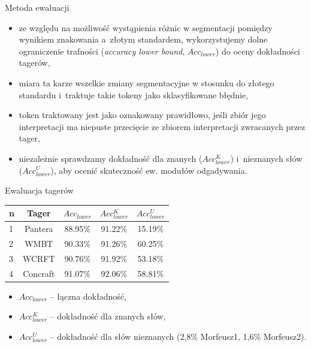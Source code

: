 \documentclass[xcolor=dvipsnames,polish]{beamer}
\begin{document}
\begin{frame}{Metoda ewaluacji}
\begin{itemize}
\item ze względu na możliwość wystąpienia różnic w segmentacji pomiędzy wynikiem znakowania a~złotym standardem, wykorzystujemy dolne ograniczenie trafności (\emph{accuracy lower bound}, $Acc_{lower}$) do oceny dokładności tagerów,
\item miara ta karze wszelkie zmiany segmentacyjne w stosunku do złotego standardu i~traktuje takie tokeny jako sklasyfikowane błędnie,
\item token traktowany jest jako oznakowany prawidłowo, jeśli zbiór jego interpretacji ma niepuste przecięcie ze zbiorem interpretacji zwracanych przez tager,
\item niezależnie sprawdzamy dokładność dla znanych ($Acc^K_{lower}$) i~nieznanych słów ($Acc^U_{lower}$), aby ocenić skuteczność ew. modułów odgadywania.
\end{itemize}
\end{frame}

\begin{frame}{Ewaluacja tagerów}
\begin{center}
\begin{tabular}{lcccc} \hline
n & Tager 		& $Acc_{lower}$	& $Acc^K_{lower}$	& $Acc^U_{lower}$	\\ \hline
1 & Pantera   & 88.95\%   & 91.22\% & 15.19\% \\
2 & WMBT	 	& 90.33\%		& 91.26\%	& 60.25\%	\\
3 & WCRFT	 	& 90.76\%		& 91.92\%	& 53.18\%	\\
4 & Concraft	& 91.07\%		& 92.06\%	& 58.81\%	\\
\end{tabular}
\end{center}
\begin{itemize}
\item $Acc_{lower}$ -- łączna dokładność,
\item $Acc^K_{lower}$ -- dokładność dla znanych słów,
\item $Acc^U_{lower}$ -- dokładność dla słów nieznanych (2,8\% Morfeusz1, 1,6\% Morfeusz2).
\end{itemize}
\end{frame}
\end{document}
